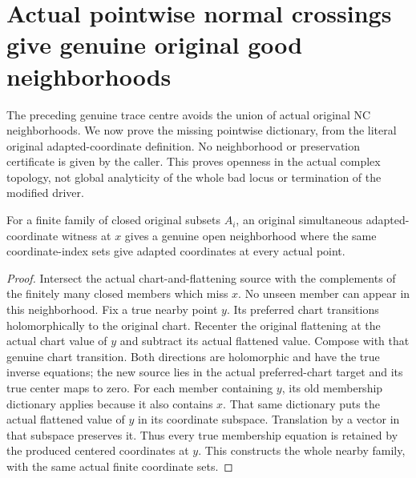 \section{Actual pointwise normal crossings give genuine original good neighborhoods}

The preceding genuine trace centre avoids the union of actual original NC
neighborhoods. We now prove the missing pointwise dictionary, from the
literal original adapted-coordinate definition. No neighborhood or
preservation certificate is given by the caller. This proves openness
in the actual complex topology, not global analyticity of the whole bad
locus or termination of the modified driver.

\begin{lemma}
\label{hir:sharp-closed-coordinate-family-genuine-neighborhoods}
\leanok
For a finite family of closed original subsets $A_i$, an original
simultaneous adapted-coordinate witness at $x$ gives a genuine open
neighborhood where the same coordinate-index sets give adapted coordinates
at every actual point.
\end{lemma}
\begin{proof}
Intersect the actual chart-and-flattening source with the complements of
the finitely many closed members which miss $x$. No unseen member can
appear in this neighborhood. Fix a true nearby point $y$. Its preferred
chart transitions holomorphically to the original chart. Recenter the
original flattening at the actual chart value of $y$ and subtract its
actual flattened value. Compose with that genuine chart transition.
Both directions are holomorphic and have the true inverse equations;
the new source lies in the actual preferred-chart target and its true
center maps to zero. For each member containing $y$, its old membership
dictionary applies because it also contains $x$. That same dictionary
puts the actual flattened value of $y$ in its coordinate subspace.
Translation by a vector in that subspace preserves it. Thus every true
membership equation is retained by the produced centered coordinates at
$y$. This constructs the whole nearby family, with the same actual
finite coordinate sets.
\end{proof}


